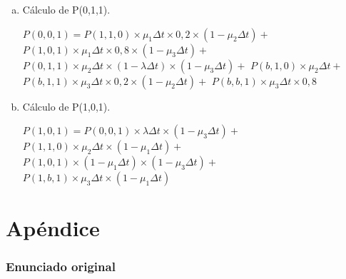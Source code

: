 \documentclass[a4paper,11pt]{article}
\begin{document}
\begin{enumerate}[a)]
  \vspace{13pt}
  \item Cálculo de P(0,1,1).

  $P(0,0,1) = P(1,1,0) \times \mu_1\Delta t \times 0,2 \times (1-\mu_2\Delta t) +$
  $P(1,0,1) \times \mu_1\Delta t \times 0,8 \times (1-\mu_3\Delta t) +$
  $P(0,1,1) \times \mu_2\Delta t \times (1-\lambda\Delta t) \times (1-\mu_3\Delta t) +$
  $P(b,1,0) \times \mu_2\Delta t +$
  $P(b,1,1) \times \mu_3\Delta t \times 0,2 \times (1-\mu_2\Delta t) +$
  $P(b,b,1) \times \mu_3\Delta t \times 0,8$

  \vspace{13pt}
  \item Cálculo de P(1,0,1).

  $P(1,0,1) = P(0,0,1) \times \lambda\Delta t \times (1-\mu_3\Delta t) +$
  $P(1,1,0) \times \mu_2\Delta t \times (1-\mu_1\Delta t) +$
  $P(1,0,1) \times (1-\mu_1\Delta t) \times (1-\mu_3\Delta t) +$
  $P(1,b,1) \times \mu_3\Delta t \times (1-\mu_1\Delta t)$

\end{enumerate}

\newpage

\part{Apéndice}
\appendix

\section{Enunciado original}\label{sec:enunciado}


\clearpage
\end{document}
